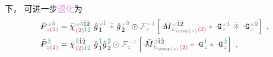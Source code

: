 下， 可进一步\textcolor{Plum}{退化}为
\begin{subequations} \label{eq:DP^(2)-3_12-g}
\begin{align}
	\Xint{\mathcolor{gray}{-}}{30}{\bar{P}}^{\;\! \mathcolor{gray}{\omega} \textcolor{PineGreen}{\hat{3}} }_{\;\! \mathcolor{gray}{z} \textcolor{Maroon}{(2)} } &= \bar{\chi}^{\;\! \mathcolor{gray}{\omega} \textcolor{PineGreen}{\hat{3}} \hat{1} \hat{2} }_{\;\! \textcolor{Maroon}{(2)} \textcolor{PineGreen}{\hat{1} \hat{2}}} ~ {\hat{g}}^{\;\! \mathcolor{gray}{\omega} \textcolor{PineGreen}{\hat{1}}}_{\;\! \hat{1}} ~\mathcolor{gray}{\widetilde *}~ {\hat{g}}^{\;\! \mathcolor{gray}{\omega} \textcolor{PineGreen}{\hat{2}}}_{\;\! \hat{2}} \odot \mathcolor{gray}{\mathcal F_{z}^{-1}} \left[ \Xint{\mathcolor{gray}{-}}{18}{\bar{M}}^{\;\! \mathcolor{gray}{\omega} \hat{1} \hat{2} }_{\;\! \mathcolor{gray}{k_{\symup{z}}} \textcolor{Maroon}{(2)} } \mathcolor{gray}{*} \Xint{\mathcolor{gray}{-}}{20}{\mathtt{G}}^{\;\! \mathcolor{gray}{\omega} \textcolor{PineGreen}{\hat{1}}}_{\;\! \mathcolor{gray}{z}} ~\mathcolor{gray}{\widetilde \circledast}~ \Xint{\mathcolor{gray}{-}}{20}{\mathtt{G}}^{\;\! \mathcolor{gray}{\omega} \textcolor{PineGreen}{\hat{2}}}_{\;\! \mathcolor{gray}{z}} \right] ~, \label{eq:DP^(2)-3_12-spectrum-g} \\
	\Xint{\mathcolor{gray}{-}}{30}{\bar{P}}^{\;\! \textcolor{PineGreen}{\hat{3}} }_{\;\! \mathcolor{gray}{z} \textcolor{Maroon}{(2)} } &= \bar{\chi}^{\;\! \textcolor{PineGreen}{\hat{3}} \hat{1} \hat{2} }_{\;\! \textcolor{Maroon}{(2)} \textcolor{PineGreen}{\hat{1} \hat{2}}} ~ {\hat{g}}^{\;\! \textcolor{PineGreen}{\hat{1}}}_{\;\! \hat{1}}  {\hat{g}}^{\;\! \textcolor{PineGreen}{\hat{2}}}_{\;\! \hat{2}} \odot \mathcolor{gray}{\mathcal F_{z}^{-1}} \left[ \Xint{\mathcolor{gray}{-}}{18}{\bar{M}}^{\;\! \mathcolor{gray}{3} \hat{1} \hat{2} }_{\;\! \mathcolor{gray}{k_{\symup{z}}} \textcolor{Maroon}{(2)} } \mathcolor{gray}{*} \Xint{\mathcolor{gray}{-}}{20}{\mathtt{G}}^{\;\! \textcolor{PineGreen}{\hat{1}}}_{\;\! \mathcolor{gray}{z}} \mathcolor{gray}{*} \Xint{\mathcolor{gray}{-}}{20}{\mathtt{G}}^{\;\! \textcolor{PineGreen}{\hat{2}}}_{\;\! \mathcolor{gray}{z}} \right] ~, \label{eq:DP^(2)-3_12-discrete-g}
\end{align}
\end{subequations}
